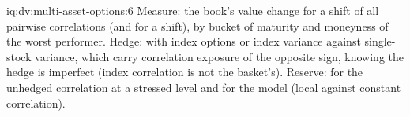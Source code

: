 \begin{solution}{iq:dv:multi-asset-options:6}
Measure: the book's value change for a shift of all pairwise correlations (and for a  shift), by bucket of maturity
and moneyness of the worst performer. Hedge: with index options or index variance against single-stock variance, which carry
correlation exposure of the opposite sign, knowing the hedge is imperfect (index correlation is not the basket's). Reserve: for the
unhedged correlation at a stressed level and for the model (local against constant correlation).
\end{solution}
